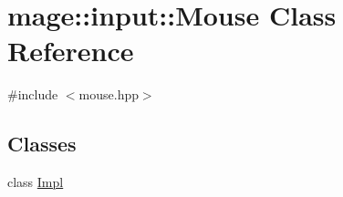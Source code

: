 \hypertarget{classmage_1_1input_1_1_mouse}{}\section{mage\+:\+:input\+:\+:Mouse Class Reference}
\label{classmage_1_1input_1_1_mouse}


{\ttfamily \#include $<$mouse.\+hpp$>$}

\subsection*{Classes}
\begin{DoxyCompactItemize}
\item 
class \mbox{\hyperlink{classmage_1_1input_1_1_mouse_1_1_impl}{Impl}}
\end{DoxyCompactItemize}
